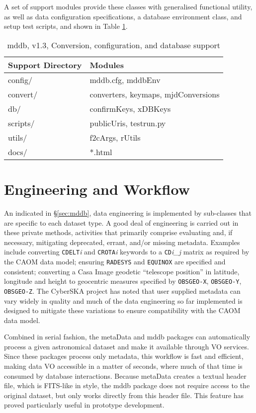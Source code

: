 \documentclass[11pt,twoside]{article}
\begin{document}
A set of support modules provide these classes with generalised
functional utility, as well as data configuration specifications, a
database environment class, and setup test scripts, and shown in Table \ref{tab:mddbsubs}.

\begin{table}[htbp]
  \centering
  \begin{tabular}{|l|p{8.0cm}|} 
    \hline
    \sc \textbf{Support Directory} & \textbf{Modules} \\
    \hline
    config/ &  mddb.cfg, mddbEnv \\
    convert/ & converters, keymaps, mjdConversions \\
    db/ &  confirmKeys, xDBKeys \\
    scripts/ &  publicUris, testrun.py \\
    utils/  & f2cArgs, rUtils \\
    \hline
    docs/   &  *.html\\
    \hline
 \end{tabular}
  \caption{mddb, v1.3, Conversion, configuration, and database support}
  \label{tab:mddbsubs}
\end{table}

\section{Engineering and Workflow}
An indicated in \S \ref{sec:mddb}, data engineering is implemented by
sub-classes that are specific to each dataset type. A good deal of
engineering is carried out in these private methods, activities that
primarily comprise evaluating and, if necessary, mitigating
deprecated, errant, and/or missing metadata. Examples include converting
\texttt{{\small CDELT}}\textit{i} and \texttt{{\small CROTA}}\textit{i} keywords to a
\texttt{{\small CD}}\textit{i\_j} matrix as required by the CAOM data model;
ensuring \texttt{{\small RADESYS}} and \texttt{{\small EQUINOX}} are specified and
consistent; converting a Casa Image geodetic ``telescope position'' in
latitude, longitude and height to geocentric measures specified
by \texttt{{\small OBSGEO-X}}, \texttt{{\small OBSGEO-Y}}, \texttt{{\small OBSGEO-Z}}. The
CyberSKA project has noted that user supplied metadata can vary widely
in quality and much of the data engineering so far implemented is
designed to mitigate these variations to ensure compatibility with the
CAOM data model.

Combined in serial fashion, the metaData and mddb packages can
automatically process a given astronomical dataset and make it
available through VO services. Since these packages process only
metadata, this workflow is fast and efficient, making data VO
accessible in a matter of seconds, where much of that time is consumed
by database interactions. Because metaData creates a textual header
file, which is FITS-like in style, the mddb package does not require
access to the original dataset, but only works directly from this
header file. This feature has proved particularly useful in prototype development.
\end{document}
